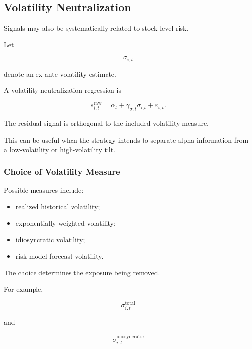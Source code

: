 \documentclass[11pt,a4paper]{article}
\begin{document}
\subsection{Volatility Neutralization}
\label{subsec:volatility_neutralization}

Signals may also be systematically related to stock-level risk.

Let

\begin{equation}
\sigma_{i,t}
\end{equation}

denote an ex-ante volatility estimate.

A volatility-neutralization regression is

\begin{equation}
\boxed{
s_{i,t}^{\mathrm{raw}}
=
\alpha_t
+
\gamma_{\sigma,t}
\sigma_{i,t}
+
\varepsilon_{i,t}.
}
\end{equation}

The residual signal is orthogonal to the included volatility measure.

This can be useful when the strategy intends to separate alpha information from
a low-volatility or high-volatility tilt.


\subsubsection{Choice of Volatility Measure}

Possible measures include:

\begin{itemize}
    \item realized historical volatility;
    \item exponentially weighted volatility;
    \item idiosyncratic volatility;
    \item risk-model forecast volatility.
\end{itemize}

The choice determines the exposure being removed.

For example,

\begin{equation}
\sigma_{i,t}^{\mathrm{total}}
\end{equation}

and

\begin{equation}
\sigma_{i,t}^{\mathrm{idiosyncratic}}
\end{equation}
\end{document}
